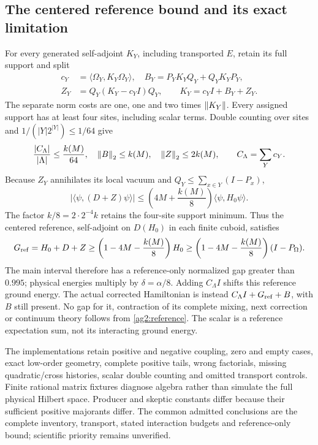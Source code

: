\subsection{The centered reference bound and its exact limitation}
For every generated self-adjoint $K_Y$, including transported $E$, retain its full support and split
\begin{align}
c_Y&=\langle\Omega_Y,K_Y\Omega_Y\rangle,\quad
B_Y=P_YK_YQ_Y+Q_YK_YP_Y,\nonumber\\
Z_Y&=Q_Y(K_Y-c_YI)Q_Y,\qquad K_Y=c_YI+B_Y+Z_Y.
\label{ag2:split}
\end{align}
The separate norm costs are one, one and two times $\left\lVert K_Y\right\rVert$. Every assigned support has at least four sites, including scalar terms. Double counting over sites and $1/(|Y|2^{|Y|})\le1/64$ give
\begin{equation}
\frac{|C_\Lambda|}{|\Lambda|}\le\frac{k(M)}{64},\quad
\left\lVert B\right\rVert_2\le k(M),\quad \left\lVert Z\right\rVert_2\le2k(M),\qquad C_\Lambda=\sum_Yc_Y.
\label{ag2:density}
\end{equation}
Because $Z_Y$ annihilates its local vacuum and $Q_Y\le\sum_{x\in Y}(I-P_x)$,
\begin{equation}
|\langle\psi,(D+Z)\psi\rangle|
\le\left(4M+\frac{k(M)}8\right)\langle\psi,H_0\psi\rangle.
\label{ag2:form}
\end{equation}
The factor $k/8=2\cdot2^{-4}k$ retains the four-site support minimum. Thus the centered reference, self-adjoint on $D(H_0)$ in each finite cuboid, satisfies
\begin{equation}
G_{\rm ref}=H_0+D+Z\ge
\left(1-4M-\frac{k(M)}8\right)H_0
\ge\left(1-4M-\frac{k(M)}8\right)(I-P_\Omega).
\label{ag2:reference}
\end{equation}
The main interval therefore has a reference-only normalized gap greater than $0.995$; physical energies multiply by $\delta=\alpha/8$. Adding $C_\Lambda I$ shifts this reference ground energy. The actual corrected Hamiltonian is instead $C_\Lambda I+G_{\rm ref}+B$, with $B$ still present. No gap for it, contraction of its complete mixing, next correction or continuum theory follows from \eqref{ag2:reference}. The scalar is a reference expectation sum, not its interacting ground energy.

The implementations retain positive and negative coupling, zero and empty cases, exact low-order geometry, complete positive tails, wrong factorials, missing quadratic/cross histories, scalar double counting and omitted transport controls. Finite rational matrix fixtures diagnose algebra rather than simulate the full physical Hilbert space. Producer and skeptic constants differ because their sufficient positive majorants differ. The common admitted conclusions are the complete inventory, transport, stated interaction budgets and reference-only bound; scientific priority remains unverified.
